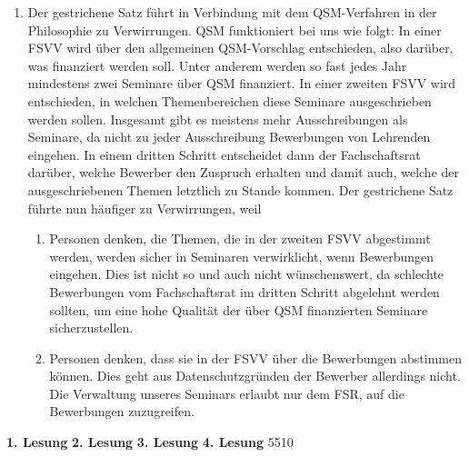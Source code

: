 {\begin{enumerate}
\begin{enumerate}
                    \item Der gestrichene Satz führt in Verbindung mit dem QSM-Verfahren in der Philosophie zu Verwirrungen. QSM funktioniert bei uns wie folgt:
                    In einer FSVV wird über den allgemeinen QSM-Vorschlag entschieden, also darüber, was finanziert werden soll. Unter anderem werden so fast jedes Jahr mindestens zwei Seminare über QSM finanziert.
                    In einer zweiten FSVV wird entschieden, in welchen Themenbereichen diese Seminare ausgeschrieben werden sollen. Insgesamt gibt es meistens mehr Ausschreibungen als Seminare, da nicht zu jeder Ausschreibung Bewerbungen von Lehrenden eingehen.
                    In einem dritten Schritt entscheidet dann der Fachschaftsrat darüber, welche Bewerber den Zuspruch erhalten und damit auch, welche der ausgeschriebenen Themen letztlich zu Stande kommen.
                    Der gestrichene Satz führte nun häufiger zu Verwirrungen, weil 
                    \begin{enumerate}
                        \item Personen denken, die Themen, die in der zweiten FSVV abgestimmt werden, werden sicher in Seminaren verwirklicht, wenn Bewerbungen eingehen. Dies ist nicht so und auch nicht wünschenswert, da schlechte Bewerbungen vom Fachschaftsrat im dritten Schritt abgelehnt werden sollten, um eine hohe Qualität der über QSM finanzierten Seminare sicherzustellen.
                        \item Personen denken, dass sie in der FSVV über die Bewerbungen abstimmen können. Dies geht aus Datenschutzgründen der Bewerber allerdings nicht. Die Verwaltung unseres Seminars erlaubt nur dem FSR, auf die Bewerbungen zuzugreifen.
                    \end{enumerate}
                \end{enumerate} 
        \end{enumerate}
    }{
        \textbf{1. Lesung}
        \ul{}
        \textbf{2. Lesung}
        \ul{}
        \textbf{3. Lesung}
        \ul{}
        \textbf{4. Lesung}
        \ul{}
    }{55}{1}{0}

